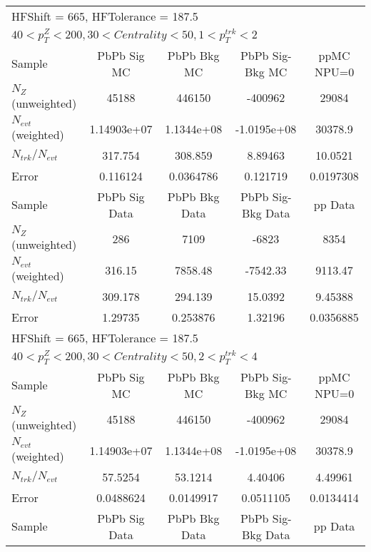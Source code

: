 \clearpage
\begin{table}[h!]
\centering
\begin{tabular}{|l|c|c|c|c|}
\multicolumn{5}{l}{ HFShift = 665, HFTolerance = 187.5}\\
\multicolumn{5}{l}{ $40 < p_{T}^{Z} < 200, 30 < Centrality < 50, 1 < p_{T}^{trk} < 2$}\\
\hline\hline
Sample         & PbPb Sig MC    & PbPb Bkg MC    & PbPb Sig-Bkg MC& ppMC NPU=0     \\
$N_Z$ (unweighted)& 45188          & 446150         & -400962        & 29084          \\
$N_{evt}$ (weighted)& 1.14903e+07    & 1.1344e+08     & -1.0195e+08    & 30378.9        \\
$N_{trk}/N_{evt}$& 317.754        & 308.859        & 8.89463        & 10.0521        \\
Error          & 0.116124       & 0.0364786      & 0.121719       & 0.0197308      \\
\hline
Sample         & PbPb Sig Data  & PbPb Bkg Data  & PbPb Sig-Bkg Data& pp Data  \\
$N_Z$ (unweighted)& 286            & 7109           & -6823          & 8354           \\
$N_{evt}$ (weighted)& 316.15         & 7858.48        & -7542.33       & 9113.47        \\
$N_{trk}/N_{evt}$& 309.178        & 294.139        & 15.0392        & 9.45388        \\
Error          & 1.29735        & 0.253876       & 1.32196        & 0.0356885      \\
\hline\hline
\multicolumn{5}{l}{ HFShift = 665, HFTolerance = 187.5}\\
\multicolumn{5}{l}{ $40 < p_{T}^{Z} < 200, 30 < Centrality < 50, 2 < p_{T}^{trk} < 4$}\\
\hline\hline
Sample         & PbPb Sig MC    & PbPb Bkg MC    & PbPb Sig-Bkg MC& ppMC NPU=0     \\
$N_Z$ (unweighted)& 45188          & 446150         & -400962        & 29084          \\
$N_{evt}$ (weighted)& 1.14903e+07    & 1.1344e+08     & -1.0195e+08    & 30378.9        \\
$N_{trk}/N_{evt}$& 57.5254        & 53.1214        & 4.40406        & 4.49961        \\
Error          & 0.0488624      & 0.0149917      & 0.0511105      & 0.0134414      \\
\hline
Sample         & PbPb Sig Data  & PbPb Bkg Data  & PbPb Sig-Bkg Data& pp Data  \\

\end{tabular}
\end{table}
